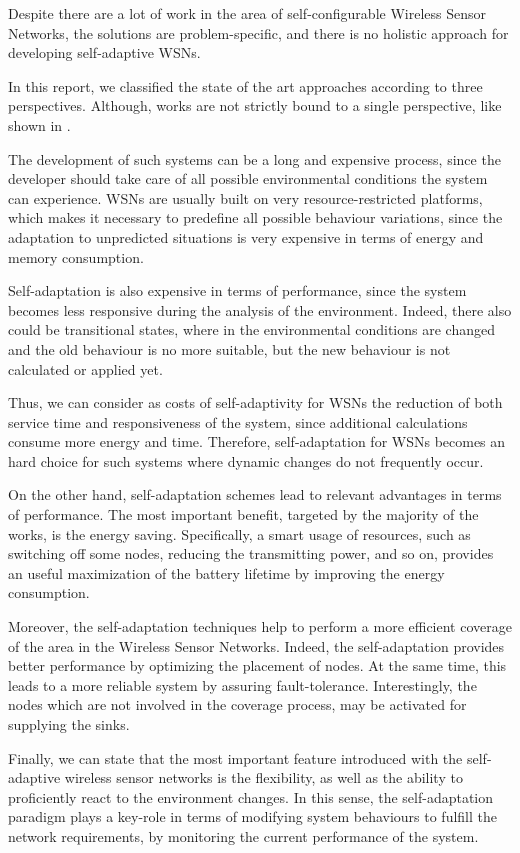
Despite there are a lot of work in the area of self-configurable Wireless Sensor
Networks, the solutions are problem-specific, and there is no holistic approach
for developing self-adaptive WSNs. 

In this report, we classified the state of the art approaches according to three
perspectives. Although, works are not strictly bound to a single perspective,
like shown in \cite{ascent}.

The development of such systems can be a long and expensive process, since the
developer should take care of all possible environmental conditions the system can
experience.  WSNs are usually built on very resource-restricted platforms,
which makes it necessary to predefine all possible behaviour variations, since
the adaptation to unpredicted situations is very expensive in terms of
energy and memory consumption.

Self-adaptation is also expensive in terms of performance, since the system
becomes less responsive during the analysis of the environment. Indeed, there
also could be transitional states, where in the environmental conditions are
changed and the old behaviour is no more suitable, but the new behaviour is not
calculated or applied yet.

Thus, we can consider as
costs of self-adaptivity for WSNs the reduction of both service time and
responsiveness of the system, since additional calculations consume more energy
and time. Therefore, self-adaptation for WSNs becomes an hard choice for such
systems where dynamic changes do not frequently occur. 

On the other hand, self-adaptation schemes lead to relevant advantages in terms
of performance. The most important benefit, targeted by the majority of the
works, is the energy saving. Specifically, a smart usage of resources, such
as switching off some nodes, reducing the transmitting power, and so
on, provides an useful maximization of the battery lifetime by improving the
energy consumption. 

Moreover, the self-adaptation techniques help to perform a more efficient
coverage of the area in the Wireless Sensor Networks. Indeed, the
self-adaptation provides better performance by optimizing the placement of
nodes.  At the same time, this leads to a more reliable system by assuring
fault-tolerance. Interestingly, the nodes which are not involved in the coverage
process, may be activated for supplying the sinks.

Finally, we can state that the most important feature introduced with the
self-adaptive wireless sensor networks is the flexibility, as well as the
ability to proficiently react to the environment changes. In this sense, the
self-adaptation paradigm plays a key-role in terms of modifying system
behaviours to fulfill the network requirements, by monitoring the current
performance of the system.


